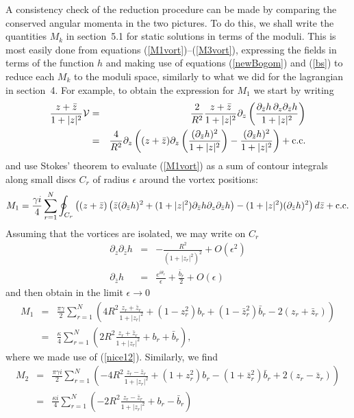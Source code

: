 \documentclass[a4paper,11pt]{article}
\begin{document}
A consistency check of the reduction procedure can be made by
comparing the conserved angular momenta in the two pictures. To do
this, we shall write the quantities $M_{k}$ in section~5.1 for static 
solutions in terms of the moduli. 
This is most easily done from equations
(\ref{M1vort})--(\ref{M3vort}), expressing the fields in terms of the
function $h$ and making use of equations 
(\ref{newBogom}) and (\ref{bs}) to reduce each
$M_{k}$ to the moduli space, similarly to what we did for the
lagrangian in section~4. 
For example, to obtain the expression for $M_{1}$ we start by writing 
\begin{eqnarray*}
\frac{z+\bar{z}}{1+|z|^{2}}{\cal V}&=&
\frac{2}{R^{2}} \frac{z+\bar{z}}{1+|z|^{2}} \partial_{z}\left(
\frac{\partial_{\bar{z}}h \,\partial_{z}\partial_{\bar{z}}h }
{1+|z|^{2}}\right)\\
&=&\frac{4}{R^{2}}\partial_{z}\left( (z+\bar{z})
\partial_{z}\left(\frac{(\partial_{\bar{z}}h)^{2}}{1+|z|^{2}}\right)
-\frac{(\partial_{\bar{z}}h)^{2}}{1+|z|^{2}} \right) + {\rm c.c.}
\end{eqnarray*}
and use Stokes' theorem to evaluate (\ref{M1vort}) as a sum of contour
integrals along small discs $C_{r}$ of radius $\epsilon$ around the vortex
positions:
\[
M_{1}=\frac{\gamma i}{4}\sum_{r=1}^{N}\oint_{C_{r}}\left(
(z+\bar{z})\left( \bar{z} (\partial_{\bar{z}}h)^{2}+
(1+|z|^{2})\partial_{\bar{z}}h \partial_{z}\partial_{\bar{z}}h  \right)
-(1+|z|^{2})(\partial_{\bar{z}}h)^{2}  \right)d\bar{z}+{\rm c.c.}
\]
Assuming that the vortices are isolated, we may write on $C_{r}$
\begin{eqnarray*}
\partial_{z}\partial_{\bar{z}}h&=&-\frac{R^{2}}{(1+|z_{r}|^{2})^{2}}+
O(\epsilon^{2})\\
\partial_{\bar{z}}h&=&\frac{e^{i\theta_{r}}}{\epsilon}+\frac{\bar{b}_{r}}{2}
+O(\epsilon)
\end{eqnarray*}
and then obtain in the limit $\epsilon\rightarrow 0$
\begin{eqnarray*}
M_{1}&=&\frac{\pi \gamma}{2}\sum_{r=1}^{N} \left(
4R^{2}\frac{z_{r} + \bar{z}_{r}}{1+|z_{r}|^{2}}+
\left( 1-z_{r}^{2}\right)b_{r}+ \left( 1-\bar{z}_{r}^{2}\right)\bar{b}_{r} 
-2(z_{r}+\bar{z}_{r}) 
\right) \\
&=&\frac{\kappa}{4}\sum_{r=1}^{N}\left(
2R^{2}\frac{z_{r}+\bar{z}_{r}}{1+|z_{r}|^{2}}+b_{r}+\bar{b}_{r}
\right),
\end{eqnarray*}
where we made use of (\ref{nice12}).
Similarly, we find
\begin{eqnarray*}
M_{2}&=&\frac{\pi \gamma i}{2}\sum_{r=1}^{N} \left(
-4R^{2}\frac{z_{r} - \bar{z}_{r}}{1+|z_{r}|^{2}}+\left( 1+z_{r}^{2}\right)b_{r}- \left(1+\bar{z}_{r}^{2}\right)\bar{b}_{r}
+2(z_{r}-\bar{z}_{r}) \right)\\
&=&\frac{\kappa i}{4}\sum_{r=1}^{N}\left(
-2R^{2}\frac{z_{r}-\bar{z}_{r}}{1+|z_{r}|^{2}}+b_{r}-\bar{b}_{r}
\right)
\end{eqnarray*}
\end{document}
